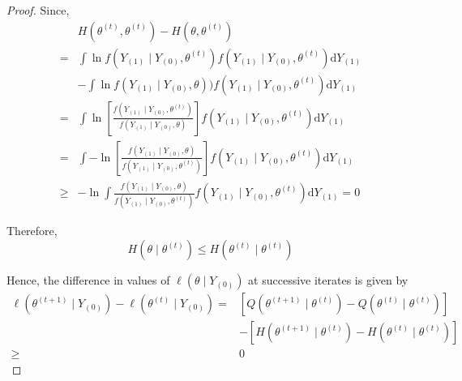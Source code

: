 \begin{proof}
	Since,
	\begin{equation}
		\begin{aligned}
			     & H\left(\theta^{(t)},\theta^{(t)}\right)-H\left(\theta,\theta^{(t)}\right)                                                                                                           \\
			=    & \int\ln f\left(Y_{(1)}\mid Y_{(0)},\theta^{(t)}\right)f\left(Y_{(1)}\mid Y_{(0)},\theta^{(t)}\right)\mathrm{d}Y_{(1)}                                                               \\
			     & -\int\ln f\left(Y_{(1)}\mid Y_{(0)},\theta\right))f\left(Y_{(1)}\mid Y_{(0)},\theta^{(t)}\right)\mathrm{d}Y_{(1)}                                                                   \\
			=    & \int\ln\left[\frac{f\left(Y_{(1)}\mid Y_{(0)},\theta^{(t)}\right)}{f\left(Y_{(1)}\mid Y_{(0)},\theta\right)}\right]f\left(Y_{(1)}\mid Y_{(0)},\theta^{(t)}\right)\mathrm{d}Y_{(1)}  \\
			=    & \int-\ln\left[\frac{f\left(Y_{(1)}\mid Y_{(0)},\theta\right)}{f\left(Y_{(1)}\mid Y_{(0)},\theta^{(t)}\right)}\right]f\left(Y_{(1)}\mid Y_{(0)},\theta^{(t)}\right)\mathrm{d}Y_{(1)} \\
			\geq & -\ln\int\frac{f\left(Y_{(1)}\mid Y_{(0)},\theta\right)}{f\left(Y_{(1)}\mid Y_{(0)},\theta^{(t)}\right)}f\left(Y_{(1)}\mid Y_{(0)},\theta^{(t)}\right)\mathrm{d}Y_{(1)}=0
		\end{aligned}
	\end{equation}

	Therefore,
	\begin{equation}
		H\left(\theta \mid \theta^{(t)}\right) \leq H\left(\theta^{(t)} \mid \theta^{(t)}\right)
	\end{equation}

	Hence, the difference in values of $\ell\left(\theta \mid Y_{(0)}\right)$ at successive iterates is given by
	\begin{equation}
		\begin{aligned}
			\ell\left(\theta^{(t+1)} \mid Y_{(0)}\right)-\ell\left(\theta^{(t)} \mid Y_{(0)}\right)= & \left[Q\left(\theta^{(t+1)} \mid \theta^{(t)}\right)-Q\left(\theta^{(t)} \mid \theta^{(t)}\right)\right]  \\
			                                                                                         & -\left[H\left(\theta^{(t+1)} \mid \theta^{(t)}\right)-H\left(\theta^{(t)} \mid \theta^{(t)}\right)\right] \\
			\geq                                                                                     & 0
		\end{aligned}
	\end{equation}
\end{proof}

